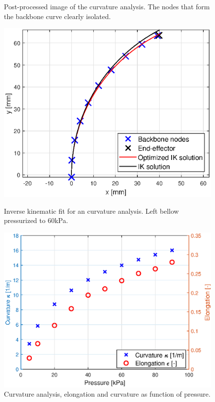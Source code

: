 \begin{figure}[H]
\begin{minipage}{0.5\textwidth}
        \caption{Post-processed image of the curvature analysis. The nodes that form the backbone curve clearly isolated.}
        \label{fig3:nodalcurvatrue}
    \end{minipage}
\begin{minipage}{0.5\textwidth}
        \centering
        \includegraphics[width=\textwidth]{Figures/Chapter3/rot60kpa.eps}
        \caption{Inverse kinematic fit for an curvature analysis. Left bellow pressurized to 60kPa.}
        \label{fig3:nodalfitcurv}
    \end{minipage}\hfill
    \begin{minipage}{0.5\textwidth}
        \centering
        \includegraphics[width=\textwidth]{Figures/Chapter3/curvanalysiscurveps.eps} 
        \caption{Curvature analysis, elongation and curvature as function of pressure.}
        \label{fig3:rotationvspressure}
    \end{minipage}
\end{figure}



